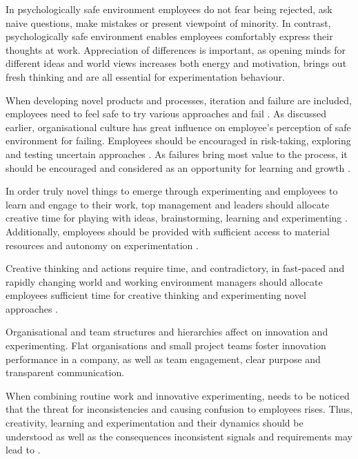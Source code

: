 In psychologically safe environment employees do not fear being rejected, ask naive questions, make mistakes or present viewpoint of minority. In contrast, psychologically safe environment enables employees comfortably express their thoughts at work. Appreciation of differences is important, as opening minds for different ideas and world views increases both energy and motivation, brings out fresh thinking and are all essential for experimentation behaviour. \citep{garvin2008yours} 

When developing novel products and processes, iteration and failure are included, employees need to feel safe to try various approaches and fail \citep{shalley2004leaders}. As discussed earlier, organisational culture has great influence on employee's perception of safe environment for failing. Employees should be encouraged in risk-taking, exploring and testing uncertain approaches \citep{garvin2008yours}. As failures bring most value to the process, it should be encouraged \citep{thomke2001enlightened} and considered as an opportunity for learning and growth \citep{farson2002failuretolerantleader}. 

In order truly novel things to emerge through experimenting and employees to learn and engage to their work, top management and leaders should allocate creative time for playing with ideas, brainstorming, learning and experimenting \citep{amabile2002creativity}. Additionally, employees should be provided with sufficient access to material resources \citep{katz1985project} and autonomy on experimentation \citep{shalley2004leaders}. 

Creative thinking and actions require time, and contradictory, in fast-paced and rapidly changing world and working environment managers should allocate employees sufficient time for creative thinking and experimenting novel approaches \citep{shalley2004leaders}.

Organisational and team structures and hierarchies affect on innovation and experimenting. Flat organisations and small project teams foster innovation performance in a company, as well as team engagement, clear purpose and transparent communication. \citep{shalley2004leaders}

When combining routine work and innovative experimenting, needs to be noticed that the threat for inconsistencies and causing confusion to employees rises. Thus, creativity, learning and experimentation and their dynamics should be understood as well as the consequences inconsistent signals and requirements may lead to \citep{lee2004mixed}.

